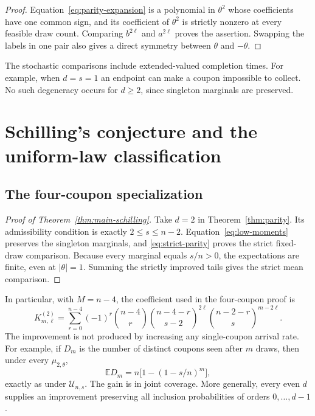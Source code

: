 \documentclass[11pt]{article}
\numberwithin{equation}{section}
\theoremstyle{remark}
\newcommand{\E}{\mathbb E}
\newcommand{\1}{\mathbf 1}
\newcommand{\U}{\mathcal U}
\begin{document}
\begin{proof}
Equation~\eqref{eq:parity-expansion} is a polynomial in $\theta^2$ whose coefficients have one common sign, and its coefficient of $\theta^2$ is strictly nonzero at every feasible draw count. Comparing $b^{2\ell}$ and $a^{2\ell}$ proves the assertion. Swapping the labels in one pair also gives a direct symmetry between $\theta$ and $-\theta$.
\end{proof}

The stochastic comparisons include extended-valued completion times. For example, when $d=s=1$ an endpoint can make a coupon impossible to collect. No such degeneracy occurs for $d\geq2$, since singleton marginals are preserved.

\section{Schilling's conjecture and the uniform-law classification}\label{sec:schilling}

\subsection{The four-coupon specialization}

\begin{proof}[Proof of Theorem~\ref{thm:main-schilling}]
Take $d=2$ in Theorem~\ref{thm:parity}. Its admissibility condition is exactly $2\leq s\leq n-2$. Equation~\eqref{eq:low-moments} preserves the singleton marginals, and \eqref{eq:strict-parity} proves the strict fixed-draw comparison. Because every marginal equals $s/n>0$, the expectations are finite, even at $|\theta|=1$. Summing the strictly improved tails gives the strict mean comparison.
\end{proof}

In particular, with $M=n-4$, the coefficient used in the four-coupon proof is
\[
 K_{m,\ell}^{(2)}=\sum_{r=0}^{n-4}(-1)^r\binom{n-4}{r}
 \binom{n-4-r}{s-2}^{2\ell}\binom{n-2-r}{s}^{m-2\ell}.
\]
The improvement is not produced by increasing any single-coupon arrival rate. For example, if $D_m$ is the number of distinct coupons seen after $m$ draws, then under every $\mu_{2,\theta}$,
\begin{equation}\label{eq:discovery-mean}
 \E D_m=n\bigl[1-(1-s/n)^m\bigr],
\end{equation}
exactly as under $\U_{n,s}$. The gain is in joint coverage. More generally, every even $d$ supplies an improvement preserving all inclusion probabilities of orders $0,\ldots,d-1$.
\end{document}
